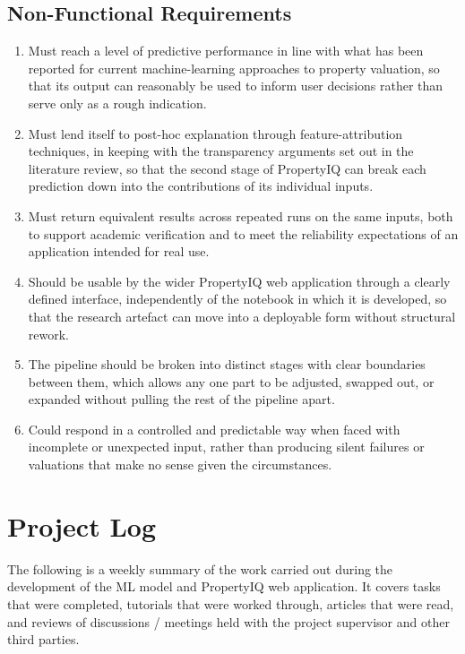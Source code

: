 \section{Non-Functional Requirements}

\begin{enumerate}

    \item Must reach a level of predictive performance in line with what has been reported for current machine-learning approaches to property valuation, so that its output can reasonably be used to inform user decisions rather than serve only as a rough indication.

    \item Must lend itself to post-hoc explanation through feature-attribution techniques, in keeping with the transparency arguments set out in the literature review, so that the second stage of PropertyIQ can break each prediction down into the contributions of its individual inputs.

    \item Must return equivalent results across repeated runs on the same inputs, both to support academic verification and to meet the reliability expectations of an application intended for real use.

    \item Should be usable by the wider PropertyIQ web application through a clearly defined interface, independently of the notebook in which it is developed, so that the research artefact can move into a deployable form without structural rework.

    \item The pipeline should be broken into distinct stages with clear boundaries between them, which allows any one part to be adjusted, swapped out, or expanded without pulling the rest of the pipeline apart.

    \item Could respond in a controlled and predictable way when faced with incomplete or unexpected input, rather than producing silent failures or valuations that make no sense given the circumstances.
    
\end{enumerate}


\chapter{Project Log}
\label{ProjectLog}

The following is a weekly summary of the work carried out during the development of the ML model and PropertyIQ web application. It covers tasks that were completed, tutorials that were worked through, articles that were read, and reviews of discussions / meetings held with the project supervisor and other third parties. 

